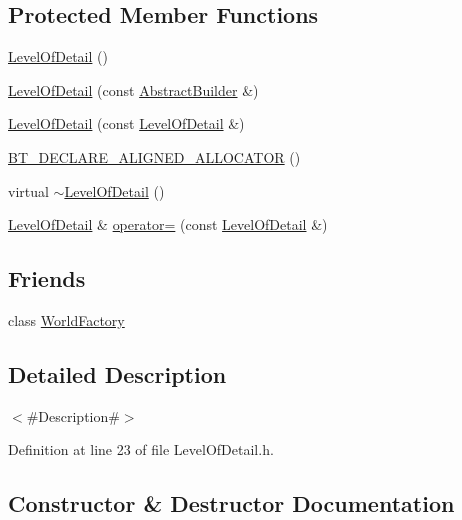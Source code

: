 \subsection*{Protected Member Functions}
\begin{DoxyCompactItemize}
\item 
\mbox{\hyperlink{classnjli_1_1_level_of_detail_a875c55721aad141c9db3da41bc600be5}{Level\+Of\+Detail}} ()
\item 
\mbox{\hyperlink{classnjli_1_1_level_of_detail_a272925da421ba01f41ed17c013d30d96}{Level\+Of\+Detail}} (const \mbox{\hyperlink{classnjli_1_1_abstract_builder}{Abstract\+Builder}} \&)
\item 
\mbox{\hyperlink{classnjli_1_1_level_of_detail_a145baec0397df5a7f98ed1a7cf202c7a}{Level\+Of\+Detail}} (const \mbox{\hyperlink{classnjli_1_1_level_of_detail}{Level\+Of\+Detail}} \&)
\item 
\mbox{\hyperlink{classnjli_1_1_level_of_detail_a2979efde7c79a0e8fa14bdd386ca071c}{B\+T\+\_\+\+D\+E\+C\+L\+A\+R\+E\+\_\+\+A\+L\+I\+G\+N\+E\+D\+\_\+\+A\+L\+L\+O\+C\+A\+T\+OR}} ()
\item 
virtual \mbox{\hyperlink{classnjli_1_1_level_of_detail_a9b17cafbbe17ece5d3bed3da04cc4e38}{$\sim$\+Level\+Of\+Detail}} ()
\item 
\mbox{\hyperlink{classnjli_1_1_level_of_detail}{Level\+Of\+Detail}} \& \mbox{\hyperlink{classnjli_1_1_level_of_detail_a822c7e770a22199a6bb830ad63063a44}{operator=}} (const \mbox{\hyperlink{classnjli_1_1_level_of_detail}{Level\+Of\+Detail}} \&)
\end{DoxyCompactItemize}
\subsection*{Friends}
\begin{DoxyCompactItemize}
\item 
class \mbox{\hyperlink{classnjli_1_1_level_of_detail_acb96ebb09abe8f2a37a915a842babfac}{World\+Factory}}
\end{DoxyCompactItemize}


\subsection{Detailed Description}
$<$\#\+Description\#$>$ 

Definition at line 23 of file Level\+Of\+Detail.\+h.



\subsection{Constructor \& Destructor Documentation}
\mbox{\label{classnjli_1_1_level_of_detail_a875c55721aad141c9db3da41bc600be5}} 
